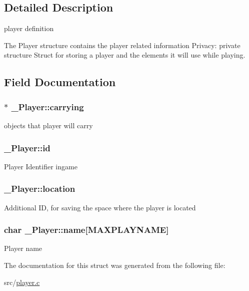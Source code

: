 \subsection{Detailed Description}
player definition 

The Player structure contains the player related information Privacy\+: private structure Struct for storing a player and the elements it will use while playing. 

\subsection{Field Documentation}
\subsubsection[{\texorpdfstring{carrying}{carrying}}]{$\ast$ \+\_\+\+Player\+::carrying}\hypertarget{struct__Player_a816df014a3e27f7ef65b16007bc26b41}{}\label{struct__Player_a816df014a3e27f7ef65b16007bc26b41}
objects that player will carry 
\subsubsection[{\texorpdfstring{id}{id}}]{ \+\_\+\+Player\+::id}\hypertarget{struct__Player_a60d635cd063816a9c1bd873f4868bb90}{}\label{struct__Player_a60d635cd063816a9c1bd873f4868bb90}
Player Identifier ingame 
\subsubsection[{\texorpdfstring{location}{location}}]{ \+\_\+\+Player\+::location}\hypertarget{struct__Player_adbb6195d15b88f3f658e74274eff52d8}{}\label{struct__Player_adbb6195d15b88f3f658e74274eff52d8}
Additional ID, for saving the space where the player is located 
\subsubsection[{\texorpdfstring{name}{name}}]{\setlength{\rightskip}{0pt plus 5cm}char \+\_\+\+Player\+::name\mbox{[}{\bf M\+A\+X\+P\+L\+A\+Y\+N\+A\+ME}\mbox{]}}\hypertarget{struct__Player_ae3931f4219966e5a8b9fd2621f26956a}{}\label{struct__Player_ae3931f4219966e5a8b9fd2621f26956a}
Player name 

The documentation for this struct was generated from the following file\+:\begin{DoxyCompactItemize}
\item 
src/\hyperlink{player_8c}{player.\+c}\end{DoxyCompactItemize}
